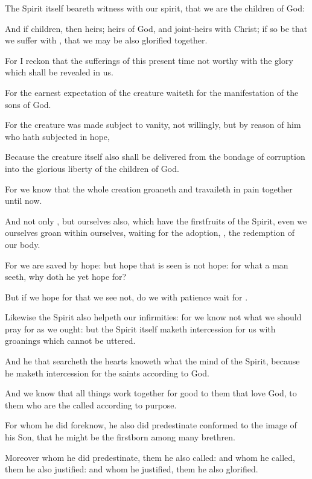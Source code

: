 {The
Spirit
itself beareth witness
with
our
spirit,
that we
are the
children of
God:

And
if
children,
then
heirs;
heirs of
God,
and
joint-heirs with
Christ; if so be
that we suffer
with
{},
that we may
be
also glorified
together.


\par }{\PP {}For I
reckon
that the
sufferings
of this
present
time
{}
not
worthy
{}
with the
glory which
shall be
revealed
in
us.

For the earnest
expectation of the
creature waiteth
for the
manifestation of the
sons of
God.

For the
creature was made
subject to
vanity,
not
willingly,
but by reason
of him who hath
subjected
{}
in
hope,

Because the
creature
itself
also shall be
delivered
from the
bondage of
corruption
into the
glorious
liberty of the
children of
God.

For we
know
that the
whole
creation
groaneth
and travaileth in pain
together
until
now.

And
not
only
{},
but
ourselves
also, which
have the
firstfruits of the
Spirit,
even
we
ourselves
groan
within
ourselves, waiting
for the
adoption,
{}, the
redemption
of
our
body.

For we are
saved by
hope:
but
hope that is
seen
is
not
hope:
for
what a
man
seeth,
why doth
he
yet hope
for?

But
if we hope
for
that we
see
not,
{} do
we
with
patience wait
for
{}.

Likewise the
Spirit
also
helpeth
our
infirmities:
for we
know
not
what we should pray
for
as we
ought:
but the
Spirit
itself maketh
intercession
for
us with
groanings which cannot be
uttered.

And he that
searcheth the
hearts
knoweth
what
{} the
mind of the
Spirit,
because he maketh
intercession
for the
saints according
to
{}
God.

And we
know
that all
things work
together
for
good to them that
love
God, to them who
are the
called according
to
{}
purpose.

For
whom he did
foreknow,
he
also did
predestinate
{} conformed
to the
image
of
his
Son,
that
he might
be the
firstborn
among
many
brethren.

Moreover
whom he did
predestinate,
them he
also
called:
and
whom he
called,
them
he
also
justified:
and
whom he
justified,
them
he
also
glorified.

}
